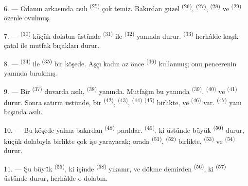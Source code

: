 \VUsaut{4.0mm}
\VUsaut{3.0mm}

6. --- Odanın arkasında asılı  \textsuperscript{(25)}
çok temiz. Bakırdan güzel  \textsuperscript{(26)},
 \textsuperscript{(27)}, 
\textsuperscript{(28)} ve  \textsuperscript{(29)} özenle
ovulmuş.

7. ---  \textsuperscript{(30)} küçük dolabın üstünde
 \textsuperscript{(31)} ile 
\textsuperscript{(32)} yanında durur. 
\textsuperscript{(33)} herhâlde kaşık çatal ile mutfak bıçakları durur.

8. ---  \textsuperscript{(34)} ile 
\textsuperscript{(35)} bir köşede. Aşçı kadın az önce 
\textsuperscript{(36)} kullanmış; onu pencerenin yanında bırakmış.

9. --- Bir  \textsuperscript{(37)} duvarda asılı,
 \textsuperscript{(38)} yanında. Mutfağın bu yanında
 \textsuperscript{(39)}, 
\textsuperscript{(40)} ve  \textsuperscript{(41)} durur.
Sonra satırın üstünde, bir  \textsuperscript{(42)},
 \textsuperscript{(43)}, 
\textsuperscript{(44)}  \textsuperscript{(45)} birlikte, ve
 \textsuperscript{(46)} var. 
\textsuperscript{(47)} yanı başında asılı.

10. --- Bu köşede yalnız bakırdan  \textsuperscript{(48)}
parıldar.  \textsuperscript{(49)}, ki üstünde büyük
 \textsuperscript{(50)} durur, küçük dolabıyla birlikte çok işe
yarayacak; orada  \textsuperscript{(51)},
 \textsuperscript{(52)} birlikte, 
\textsuperscript{(53)} ve  \textsuperscript{(54)} durur.

\VUsaut{4.0mm}
\VUsaut{3.0mm}

11. --- Şu büyük  \textsuperscript{(55)}, ki içinde
 \textsuperscript{(58)} yıkanır, ve dökme demirden
 \textsuperscript{(56)}, ki 
\textsuperscript{(57)} üstünde durur, herhâlde o dolabın.

